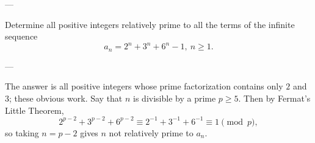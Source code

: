 
---

Determine all positive integers relatively prime to all the terms of the infinite sequence \[a_n=2^n+3^n+6^n-1,\ n\ge 1.\]

---

The answer is all positive integers whose prime factorization contains only $2$ and $3$; these obvious work. Say that $n$ is divisible by a prime $p\ge5$. Then by Fermat's Little Theorem, \[2^{p-2}+3^{p-2}+6^{p-2}\equiv 2^{-1}+3^{-1}+6^{-1}\equiv1\pmod p,\]
so taking $n=p-2$ gives $n$ not relatively prime to $a_n$.

